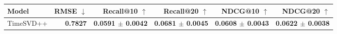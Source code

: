 \begin{tabular}{lrrrrr}
\toprule
Model & RMSE $\downarrow$ & Recall@10 $\uparrow$ & Recall@20 $\uparrow$ & NDCG@10 $\uparrow$ & NDCG@20 $\uparrow$ \\
\midrule
TimeSVD++ & \textbf{0.7827} & \textbf{0.0591 $\pm$ 0.0042} & \textbf{0.0681 $\pm$ 0.0045} & \textbf{0.0608 $\pm$ 0.0043} & \textbf{0.0622 $\pm$ 0.0038} \\
\bottomrule
\end{tabular}
